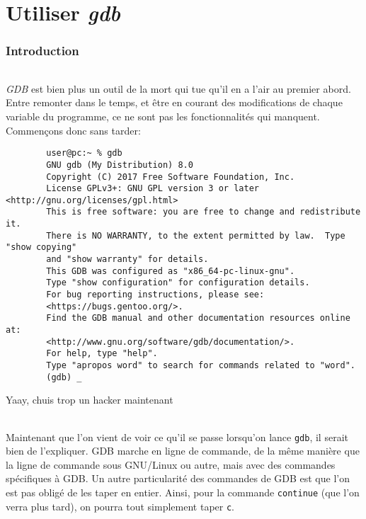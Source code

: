 \part{Utiliser \textit{gdb}}%
\label{part:gdb}

\section{Introduction}

\paragraph{} \textit{GDB} est bien plus un outil de la mort qui tue qu'il en a
l'air au premier abord. Entre remonter dans le temps, et être en courant des
modifications de chaque variable du programme, ce ne sont pas les
fonctionnalités qui manquent. Commençons donc sans tarder:

\begin{listing}[H]
	\centering
	\begin{verbatim}
		user@pc:~ % gdb
		GNU gdb (My Distribution) 8.0
		Copyright (C) 2017 Free Software Foundation, Inc.
		License GPLv3+: GNU GPL version 3 or later <http://gnu.org/licenses/gpl.html>
		This is free software: you are free to change and redistribute it.
		There is NO WARRANTY, to the extent permitted by law.  Type "show copying"
		and "show warranty" for details.
		This GDB was configured as "x86_64-pc-linux-gnu".
		Type "show configuration" for configuration details.
		For bug reporting instructions, please see:
		<https://bugs.gentoo.org/>.
		Find the GDB manual and other documentation resources online at:
		<http://www.gnu.org/software/gdb/documentation/>.
		For help, type "help".
		Type "apropos word" to search for commands related to "word".
		(gdb) _
	\end{verbatim}
	\caption{Yaay, chuis trop un hacker maintenant}
\end{listing}

\paragraph{} Maintenant que l'on vient de voir ce qu'il se passe lorsqu'on
lance \texttt{gdb}, il serait bien de l'expliquer. GDB marche en ligne de
commande, de la même manière que la ligne de commande sous GNU/Linux ou autre,
mais avec des commandes spécifiques à GDB. Un autre particularité des commandes
de GDB est que l'on est pas obligé de les taper en entier. Ainsi, pour la
commande \texttt{continue} (que l'on verra plus tard), on pourra tout
simplement taper \texttt{c}.

